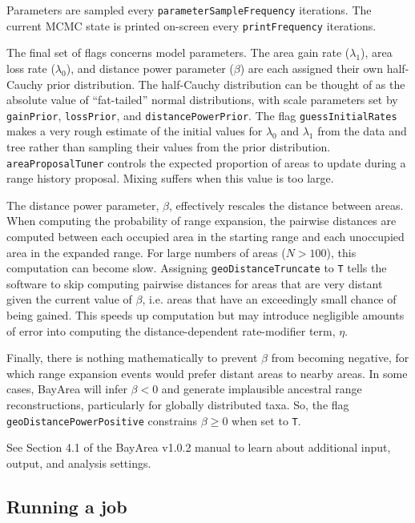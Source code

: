 \documentclass[11pt]{article}
\begin{document}
Parameters are sampled every \texttt{parameterSampleFrequency} iterations. The current MCMC state is printed on-screen every \texttt{printFrequency} iterations.

The final set of flags concerns model parameters.
The area gain rate ($\lambda_1$), area loss rate ($\lambda_0$), and distance power parameter ($\beta$) are each assigned their own half-Cauchy prior distribution.
The half-Cauchy distribution can be thought of as the absolute value of ``fat-tailed'' normal distributions, with scale parameters set by \texttt{gainPrior}, \texttt{lossPrior}, and \texttt{distancePowerPrior}.
The flag \texttt{guessInitialRates} makes a very rough estimate of the initial values for $\lambda_0$ and $\lambda_1$ from the data and tree rather than sampling their values from the prior distribution.
\texttt{areaProposalTuner} controls the expected proportion of areas to update during a range history proposal.
Mixing suffers when this value is too large.

The distance power parameter, $\beta$, effectively rescales the distance between areas.
When computing the probability of range expansion, the pairwise distances are computed between each occupied area in the starting range and each unoccupied area in the expanded range.
For large numbers of areas ($N > 100$), this computation can become slow.
Assigning \texttt{geoDistanceTruncate} to \texttt{T} tells the software to skip computing pairwise distances for areas that are very distant given the current value of $\beta$, i.e. areas that have an exceedingly small chance of being gained.
This speeds up computation but may introduce negligible amounts of error into computing the distance-dependent rate-modifier term, $\eta$.

Finally, there is nothing mathematically to prevent $\beta$ from becoming negative, for which range expansion events would prefer distant areas to nearby areas.
In some cases, BayArea will infer $\beta<0$ and generate implausible ancestral range reconstructions, particularly for globally distributed taxa.
So, the flag \texttt{geoDistancePowerPositive} constrains $\beta \geq 0$ when set to \texttt{T}.

See Section 4.1 of the BayArea v1.0.2 manual to learn about additional input, output, and analysis settings.

\subsection{Running a job}
\end{document}
